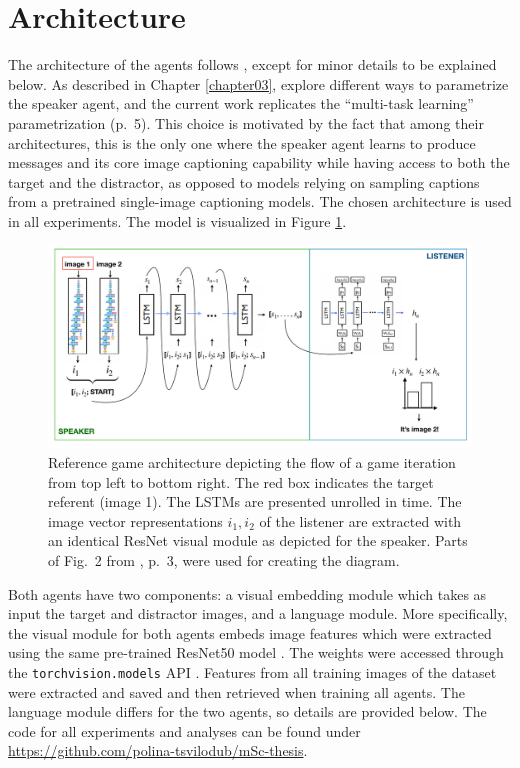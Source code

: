\section{Architecture}
\label{architecture}
The architecture of the agents follows \textcite{lazaridou2020multi}, except for minor details to be explained below. As described in Chapter \ref{chapter03}, \textcite{lazaridou2020multi} explore different ways to parametrize the speaker agent, and the current work replicates the ``multi-task learning'' parametrization (p.~5). This choice is motivated by the fact that among their architectures, this is the only one where the speaker agent learns to produce messages and its core image captioning capability while having access to both the target and the distractor, as opposed to models relying on sampling captions from a pretrained single-image captioning models. The chosen architecture is used in all experiments. The model is visualized in Figure \ref{fig:architecture}.
\begin{figure}[h]
	\centering
	\includegraphics[width=\linewidth]{images/architecture_viz_cropped.pdf}
	\caption{Reference game architecture depicting the flow of a game iteration from top left to bottom right. The red box indicates the target referent (image 1). The LSTMs are presented unrolled in time. The image vector representations $i_1, i_2$ of the listener are extracted with an identical ResNet visual module as depicted for the speaker. Parts of Fig.~2 from \cite{vinyals2015show}, p.~3, were used for creating the diagram.}
	\label{fig:architecture}
\end{figure}  

Both agents have two components: a visual embedding module which takes as input the target and distractor images, and a language module. More specifically, the visual module for both agents embeds image features which were extracted using the same pre-trained ResNet50 model \parencite{he2016deep}. The weights were accessed through the \texttt{torchvision.models} API \parencite{marcel2010torchvision}. Features from all training images of the dataset were extracted and saved and then retrieved when training all agents. 
The language module differs for the two agents, so details are provided below. 
The code for all experiments and analyses can be found under \url{https://github.com/polina-tsvilodub/mSc-thesis}. 

